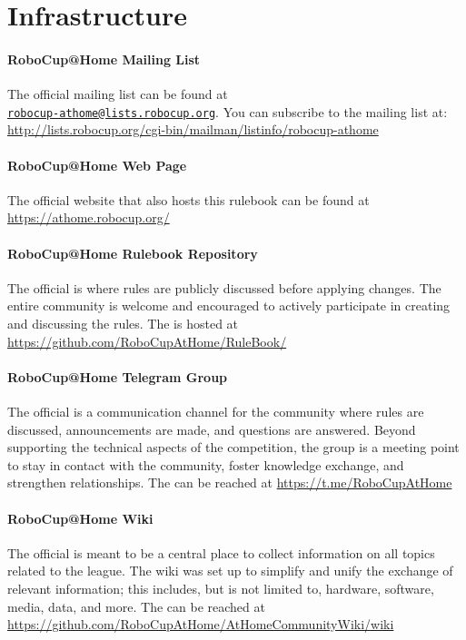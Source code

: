 \section{Infrastructure}
\label{sec:introduction:infrastructure}

\paragraph{RoboCup@Home Mailing List}
\label{sec:introduction:mailinglist}
The official \AtHome{} mailing list can be found at\\
\href{mailto:robocup-athome@lists.robocup.org}{\small\texttt{robocup-athome@lists.robocup.org}}.
You can subscribe to the mailing list at: {\small\url{http://lists.robocup.org/cgi-bin/mailman/listinfo/robocup-athome}}

\paragraph{RoboCup@Home Web Page}
\label{sec:introduction:webpage}
The official \AtHome{} website that also hosts this rulebook can be found at {\small\url{https://athome.robocup.org/}}

\paragraph{RoboCup@Home Rulebook Repository}
\label{sec:introduction:repo}
The official \AtHome{} \RR{} is where rules are publicly discussed before applying changes.
The entire \AtHome{} community is welcome and encouraged to actively participate in creating and discussing the rules.
The \RR{} is hosted at {\small\url{https://github.com/RoboCupAtHome/RuleBook/}}

\paragraph{RoboCup@Home Telegram Group}
\label{sec:introduction:telegramgroup}
The official \AtHome{} \TG{} is a communication channel for the \AtHome{} community where rules are discussed, announcements are made, and questions are answered.
Beyond supporting the technical aspects of the competition, the group is a meeting point to stay in contact with the community, foster knowledge exchange, and strengthen relationships.
The \TG{} can be reached at {\small\url{https://t.me/RoboCupAtHome}}

\paragraph{RoboCup@Home Wiki}
\label{sec:introduction:wiki}
The official \AtHome{} \WIKI{} is meant to be a central place to collect information on all topics related to the \AtHome{} league.
The wiki was set up to simplify and unify the exchange of relevant information; this includes, but is not limited to, hardware, software, media, data, and more.
The \WIKI{} can be reached at {\small\url{https://github.com/RoboCupAtHome/AtHomeCommunityWiki/wiki}}
